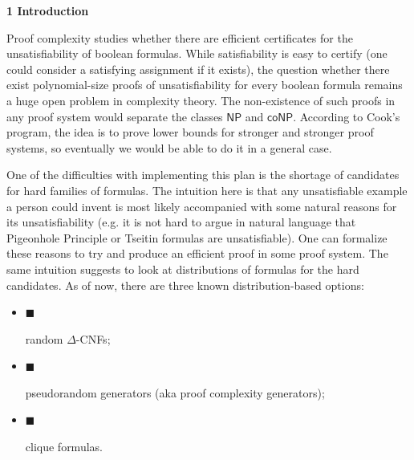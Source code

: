 

\par\medskip\noindent\textbf{
1 Introduction}\par




Proof complexity studies whether there are efficient certificates for the unsatisfiability of boolean
formulas. While satisfiability is easy to certify (one could consider a satisfying assignment if it
exists), the question whether there exist polynomial-size proofs of unsatisfiability for every
boolean formula remains a huge open problem in complexity theory. The non-existence of such proofs in any
proof system would separate the classes ${\mathsf{NP}}$ and ${\mathsf{coNP}}$. According to Cook’s program, the idea is to prove
lower bounds for stronger and stronger proof systems, so eventually we would be able to do it in a general
case.\par




One of the difficulties with implementing this plan is the shortage of candidates for hard families of
formulas. The intuition here is that any unsatisfiable example a person could invent is most likely
accompanied with some natural reasons for its unsatisfiability (e.g. it is not hard to argue in natural
language that Pigeonhole Principle or Tseitin formulas are unsatisfiable). One can formalize these
reasons to try and produce an efficient proof in some proof system. The same intuition suggests to look
at distributions of formulas for the hard candidates. As of now, there are three known distribution-based
options:\par


\begin{itemize}


\item[] 
$\blacksquare$ 


random $\Delta$-CNFs;\par





\item[] 
$\blacksquare$ 


pseudorandom generators (aka proof complexity generators);\par





\item[] 
$\blacksquare$ 


clique formulas.\par





\end{itemize}





